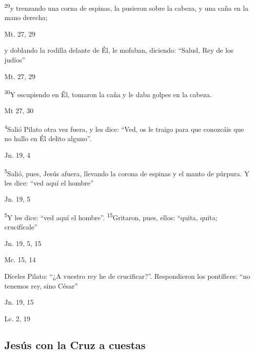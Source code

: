 \documentclass[a4paper,11pt,sans]{article}
\begin{document}
      \textsuperscript{29}y trenzando una corna de espinas, la pusieron sobre la cabeza, y una caña en la mano derecha; 
      \begin{center}
        Mt. 27, 29
      \end{center}

      y doblando la rodilla delante de Él, le mofaban, diciendo: ``Salud, Rey de los judíos''
      \begin{center}
        Mt. 27, 29
      \end{center}

      \textsuperscript{30}Y escupiendo en Él, tomaron la caña y le daba golpes en la cabeza.
      \begin{center}
        Mt 27, 30
      \end{center}

      \textsuperscript{4}Salió Pilato otra vez fuera, y les dice: ``Ved, os le traigo para que conozcáis que no hallo en Él delito alguno''.
      \begin{center}
        Jn. 19, 4
      \end{center}

      \textsuperscript{5}Salió, pues, Jesús afuera, llevando la corona de espinas y el manto de púrpura. Y les dice: ``ved aquí el hombre''
      \begin{center}
        Jn. 19, 5
      \end{center}

      \textsuperscript{5}Y les dice: ``ved aquí el hombre''. \textsuperscript{15}Gritaron, pues, ellos: ``quita, quita; crucifícale''
      \begin{center}
        Jn. 19, 5, 15
      \end{center}

      \begin{center}
        Mc. 15, 14
      \end{center}

      Díceles Pilato: ``¿A vuestro rey he de crucificar?''. Respondieron los pontífices: ``no tenemos rey, sino César''
      \begin{center}
        Jn. 19, 15
      \end{center}

      \begin{center}
        Lc. 2, 19
      \end{center}

    \subsection*{\hfil Jesús con la Cruz a cuestas \hfil}
      
\end{document}
